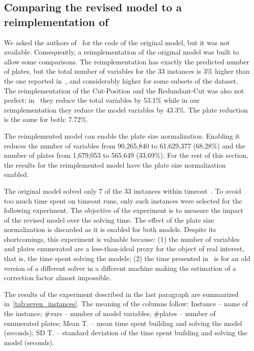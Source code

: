 \documentclass[runningheads]{llncs}
\begin{document}
\subsection{Comparing the revised model to a reimplementation of~\cite{furini:2016}}

We asked the authors of~\cite{furini:2016} for the code of the original model, but it was not available.
Consequently, a reimplementation of the original model was built to allow some comparisons.
The reimplementation has exactly the predicted number of plates, but the total number of variables for the 33 instances is 3\% higher than the one reported in~\cite{furini:2016}, and considerably higher for some subsets of the dataset.
The reimplementation of the Cut-Position and the Redundant-Cut was also not perfect: in~\cite{dimitri_thesis} they reduce the total variables by 53.1\% while in our reimplementation they reduce the model variables by 43.3\%.
The plate reduction is the same for both: 7.72\%.

The reimplemented model can enable the plate size normalization.
Enabling it reduces the number of variables from 90,265,840 to 61,629,377 (68.28\%) and the number of plates from 1,679,053 to 565,649 (33.69\%).
For the rest of this section, the results for the reimplemented model have the plate size normalization enabled.

The original model solved only 7 of the 33 instances within timeout~\cite{furini:2,016}.
To avoid too much time spent on timeout runs, only such instances were selected for the following experiment.
The objective of the experiment is to measure the impact of the revised model over the solving time. 
The effect of the plate size normalization is discarded as it is enabled for both models.
Despite its shortcomings, this experiment is valuable because: (1) the number of variables and plates enumerated are a less-than-ideal proxy for the object of real interest, that is, the time spent solving the models; (2) the time presented in~\cite{furini:2,016} is for an old version of a different solver in a different machine making the estimation of a correction factor almost impossible.

The results of the experiment described in the last paragraph are summarized in~\autoref{tab:seven_instances}.
The meaning of the columns follow: 
Instance -- name of the instance; \#vars -- number of model variables; \#plates -- number of enumerated plates; Mean T. -- mean time spent building and solving the model (seconds); SD T. -- standard deviation of the time spent building and solving the model (seconds).
\end{document}
